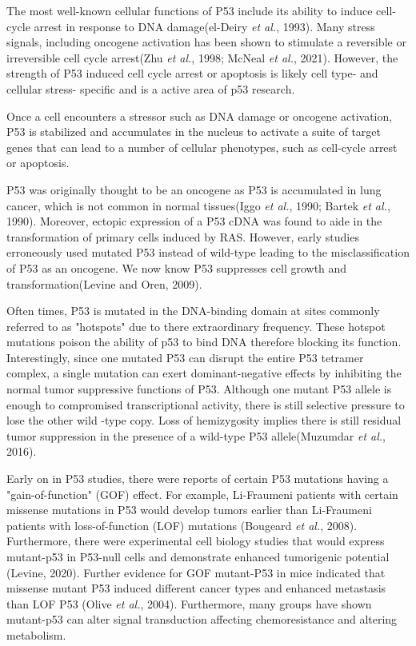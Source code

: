 The most well-known cellular functions of P53 include its ability to induce cell-cycle arrest in response to DNA damage(el-Deiry \emph{et al.}, 1993). Many stress signals, including oncogene activation has been shown to stimulate a reversible or irreversible cell cycle arrest(Zhu \emph{et al.}, 1998; McNeal \emph{et al.}, 2021). However, the strength of P53 induced cell cycle arrest or apoptosis is likely cell type- and cellular stress- specific and is a active area of p53 research.

Once a cell encounters a stressor such as DNA damage or oncogene activation, P53 is stabilized and accumulates in the nucleus to activate a suite of target genes that can lead to a number of cellular phenotypes, such as cell-cycle arrest or apoptosis.

P53 was originally thought to be an oncogene as P53 is accumulated in lung cancer, which is not common in normal tissues(Iggo \emph{et al.}, 1990; Bartek \emph{et al.}, 1990). Moreover, ectopic expression of a P53 cDNA was found to aide in the transformation of primary cells induced by RAS. However, early studies erroneously used mutated P53 instead of wild-type leading to the misclassification of P53 as an oncogene. We now know P53 suppresses cell growth and transformation(Levine and Oren, 2009).

Often times, P53 is mutated in the DNA-binding domain at sites commonly referred to as "hotspots" due to there extraordinary frequency. These hotspot mutations poison the ability of p53 to bind DNA therefore blocking its function. Interestingly, since one mutated P53 can disrupt the entire P53 tetramer complex, a single mutation can exert dominant-negative effects by inhibiting the normal tumor suppressive functions of P53. Although one mutant P53 allele is enough to compromised transcriptional activity, there is still selective pressure to lose the other wild -type copy. Loss of hemizygosity implies there is still residual tumor suppression in the presence of a wild-type P53 allele(Muzumdar \emph{et al.}, 2016).

Early on in P53 studies, there were reports of certain P53 mutations having a "gain-of-function" (GOF) effect. For example, Li-Fraumeni patients with certain missense mutations in P53 would develop tumors earlier than Li-Fraumeni patients with loss-of-function (LOF) mutations (Bougeard \emph{et al.}, 2008). Furthermore, there were experimental cell biology studies that would express mutant-p53 in P53-null cells and demonstrate enhanced tumorigenic potential (Levine, 2020). Further evidence for GOF mutant-P53 in mice indicated that missense mutant P53 induced different cancer types and enhanced metastasis than LOF P53 (Olive \emph{et al.}, 2004). Furthermore, many groups have shown mutant-p53 can alter signal transduction affecting chemoresistance and altering metabolism.

